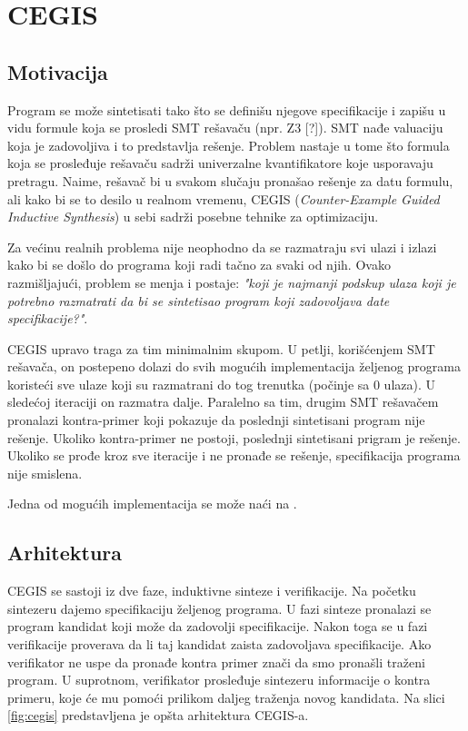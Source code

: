 \section{CEGIS}
\label{sec:cegis}


\subsection{Motivacija}
\label{subsec:Motivacija}

Program se može sintetisati tako što se definišu njegove specifikacije i zapišu u vidu formule koja se prosledi SMT rešavaču (npr. Z3 [?]). SMT nađe valuaciju koja je zadovoljiva i to predstavlja rešenje. Problem nastaje u tome što formula koja se prosleđuje rešavaču sadrži univerzalne kvantifikatore koje usporavaju pretragu. Naime, rešavač bi u svakom slučaju pronašao rešenje za datu formulu, ali kako bi se to desilo u realnom vremenu, CEGIS (\emph{Counter-Example Guided Inductive Synthesis}) u sebi sadrži posebne tehnike za optimizaciju.

Za većinu realnih problema nije neophodno da se razmatraju svi ulazi i izlazi kako bi se došlo do programa koji radi tačno za svaki od njih. Ovako razmišljajući, problem se menja i postaje: \emph{"koji je najmanji podskup ulaza koji je potrebno razmatrati da bi se sintetisao program koji zadovoljava date specifikacije?"}.

CEGIS upravo traga za tim minimalnim skupom. U petlji, korišćenjem SMT rešavača, on postepeno dolazi do svih mogućih implementacija željenog programa koristeći sve ulaze koji su razmatrani do tog trenutka (počinje sa 0 ulaza). U sledećoj iteraciji on razmatra dalje. Paralelno sa tim, drugim SMT rešavačem pronalazi kontra-primer koji pokazuje da poslednji sintetisani program nije rešenje. Ukoliko kontra-primer ne postoji, poslednji sintetisani prigram je rešenje. Ukoliko se prođe kroz sve iteracije i ne pronađe se rešenje, specifikacija programa nije smislena.

Jedna od mogućih implementacija se može naći na \cite{CEGISimpl}.


\subsection{Arhitektura}
\label{subsec:Arhitektura}

CEGIS se sastoji iz dve faze, induktivne sinteze i verifikacije. Na početku sintezeru dajemo specifikaciju željenog programa. U fazi sinteze pronalazi se program kandidat koji može da zadovolji specifikacije. Nakon toga se u fazi verifikacije proverava da li taj kandidat zaista zadovoljava specifikacije. Ako verifikator ne uspe da pronađe kontra primer znači da smo pronašli traženi program. U suprotnom, verifikator prosleđuje sintezeru informacije o kontra primeru, koje će mu pomoći prilikom daljeg traženja novog kandidata. Na slici \ref{fig:cegis} predstavljena je opšta arhitektura CEGIS-a.

